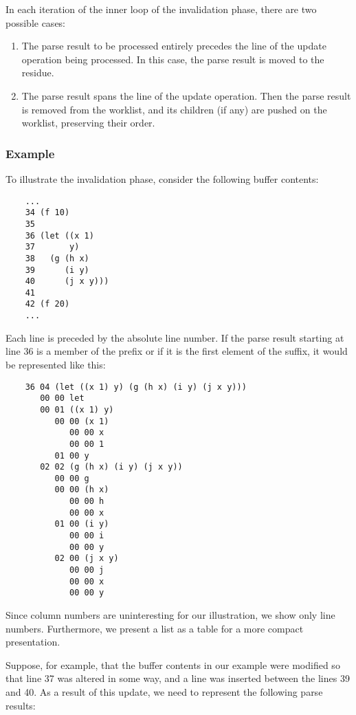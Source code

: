 In each iteration of the inner loop of the invalidation phase, there
are two possible cases:

\begin{enumerate}
\item The parse result to be processed entirely precedes the line of
  the update operation being processed.  In this case, the parse
  result is moved to the residue.
\item The parse result spans the line of the update operation.  Then
  the parse result is removed from the worklist, and its children (if
  any) are pushed on the worklist, preserving their order.
\end{enumerate}

\subsubsection{Example}

To illustrate the invalidation phase, consider the following buffer
contents:

{\small\begin{verbatim}
    ...
    34 (f 10)
    35
    36 (let ((x 1)
    37       y)
    38   (g (h x)
    39      (i y)
    40      (j x y)))
    41
    42 (f 20)
    ...
\end{verbatim}}

Each line is preceded by the absolute line number.  If the parse
result starting at line 36 is a member of the prefix or if it is the
first element of the suffix, it would be represented like this:

{\small\begin{verbatim}
    36 04 (let ((x 1) y) (g (h x) (i y) (j x y)))
       00 00 let
       00 01 ((x 1) y)
          00 00 (x 1)
             00 00 x
             00 00 1
          01 00 y
       02 02 (g (h x) (i y) (j x y))
          00 00 g
          00 00 (h x)
             00 00 h
             00 00 x
          01 00 (i y)
             00 00 i
             00 00 y
          02 00 (j x y)
             00 00 j
             00 00 x
             00 00 y
\end{verbatim}}

Since column numbers are uninteresting for our illustration, we
show only line numbers.  Furthermore, we present a list as a table for
a more compact presentation.

Suppose, for example, that the buffer contents in our example were
modified so that line 37 was altered in some way, and a line was
inserted between the lines 39 and 40.  As a result of this update, we
need to represent the following parse results:


